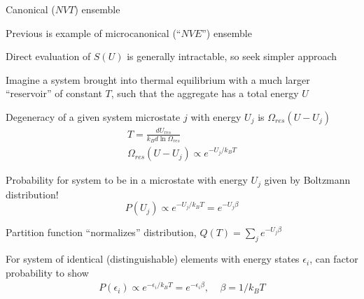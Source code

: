 \documentclass[11pt]{article}
\begin{document}
\begin{outline}
\begin{outline}
    \item Canonical ($NVT$) ensemble
      \begin{outline}
      \item Previous is example of microcanonical (``$NVE$'') ensemble
      \item Direct evaluation of $S(U)$ is generally intractable, so seek simpler approach
      \item Imagine a system brought into thermal equilibrium with a much
        larger ``reservoir'' of constant $T$, such that the aggregate has a
        total energy $U$
      \item Degeneracy of a given system microstate $j$ with energy $U_j$
        is $\Omega_{res}(U-U_j)$
        \begin{eqnarray*}
          T = \frac{dU_{res}}{k_Bd\ln\Omega_{res}} \\
          \Omega_{res}(U-U_j) \propto e^{-U_j/k_B T}
        \end{eqnarray*}
      \item Probability for system to be in a microstate with energy $U_j$ given by Boltzmann
        distribution!
        \begin{displaymath}
          P(U_j) \propto e^{-U_j/k_B T} = e^{-U_j \beta}
        \end{displaymath}
      \item Partition function ``normalizes'' distribution, $Q(T) = \sum_j
        e^{-U_j \beta}$
      \item For system of identical (distinguishable) elements with energy states $\epsilon_i$,
        can factor probability to show
        \begin{eqnarray*}
          P(\epsilon_i) \propto e^{-\epsilon_i/k_B T} = e^{-\epsilon_i \beta},\
          \ \ \ \ \beta=1/k_BT
        \end{eqnarray*}
      \end{outline}



\end{outline}
\end{outline}
\end{document}
